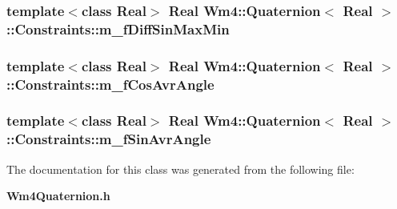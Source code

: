 \subsubsection{\setlength{\rightskip}{0pt plus 5cm}template$<$class Real$>$ Real {\bf Wm4::Quaternion}$<$ Real $>$::{\bf Constraints::m\_\-f\-Diff\-Sin\-Max\-Min}}\label{classWm4_1_1Quaternion_1_1Constraints_daeefc19ed556605868b2c15ae4bddb9}


\subsubsection{\setlength{\rightskip}{0pt plus 5cm}template$<$class Real$>$ Real {\bf Wm4::Quaternion}$<$ Real $>$::{\bf Constraints::m\_\-f\-Cos\-Avr\-Angle}}\label{classWm4_1_1Quaternion_1_1Constraints_91d840dba1dbee1313e4ecd6b1e450bb}


\subsubsection{\setlength{\rightskip}{0pt plus 5cm}template$<$class Real$>$ Real {\bf Wm4::Quaternion}$<$ Real $>$::{\bf Constraints::m\_\-f\-Sin\-Avr\-Angle}}\label{classWm4_1_1Quaternion_1_1Constraints_57d21a9c2f9c4609df3a702194ebffe5}




The documentation for this class was generated from the following file:\begin{CompactItemize}
\item 
{\bf Wm4Quaternion.h}\end{CompactItemize}
